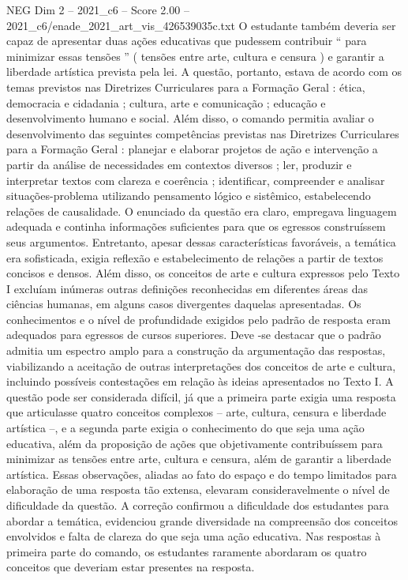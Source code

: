 \begin{textsample}{NEG Dim 2 – 2021\_c6 – Score 2.00 – 2021\_c6/enade\_2021\_art\_vis\_426539035c.txt}
O estudante também deveria ser capaz de apresentar duas ações educativas que pudessem contribuir “ para minimizar essas tensões ” ( tensões entre arte, cultura e censura ) e garantir a liberdade artística prevista pela lei.
A questão, portanto, estava de acordo com os temas previstos nas Diretrizes Curriculares para a Formação Geral : ética, democracia e cidadania ; cultura, arte e comunicação ; educação e desenvolvimento humano e social.
Além disso, o comando permitia avaliar o desenvolvimento das seguintes competências previstas nas Diretrizes Curriculares para a Formação Geral : planejar e elaborar projetos de ação e intervenção a partir da análise de necessidades em contextos diversos ; ler, produzir e interpretar textos com clareza e coerência ; identificar, compreender e analisar situações-problema utilizando pensamento lógico e sistêmico, estabelecendo relações de causalidade.
O enunciado da questão era claro, empregava linguagem adequada e continha informações suficientes para que os egressos construíssem seus argumentos.
Entretanto, apesar dessas características favoráveis, a temática era sofisticada, exigia reflexão e estabelecimento de relações a partir de textos concisos e densos.
Além disso, os conceitos de arte e cultura expressos pelo Texto I excluíam inúmeras outras definições reconhecidas em diferentes áreas das ciências humanas, em alguns casos divergentes daquelas apresentadas.
Os conhecimentos e o nível de profundidade exigidos pelo padrão de resposta eram adequados para egressos de cursos superiores.
Deve -se destacar que o padrão admitia um espectro amplo para a construção da argumentação das respostas, viabilizando a aceitação de outras interpretações dos conceitos de arte e cultura, incluindo possíveis contestações em relação às ideias apresentados no Texto I.
A questão pode ser considerada difícil, já que a primeira parte exigia uma resposta que articulasse quatro conceitos complexos – arte, cultura, censura e liberdade artística –, e a segunda parte exigia o conhecimento do que seja uma ação educativa, além da proposição de ações que objetivamente contribuíssem para minimizar as tensões entre arte, cultura e censura, além de garantir a liberdade artística.
Essas observações, aliadas ao fato do espaço e do tempo limitados para elaboração de uma resposta tão extensa, elevaram consideravelmente o nível de dificuldade da questão.
A correção confirmou a dificuldade dos estudantes para abordar a temática, evidenciou grande diversidade na compreensão dos conceitos envolvidos e falta de clareza do que seja uma ação educativa.
Nas respostas à primeira parte do comando, os estudantes raramente abordaram os quatro conceitos que deveriam estar presentes na resposta.

\end{textsample}
